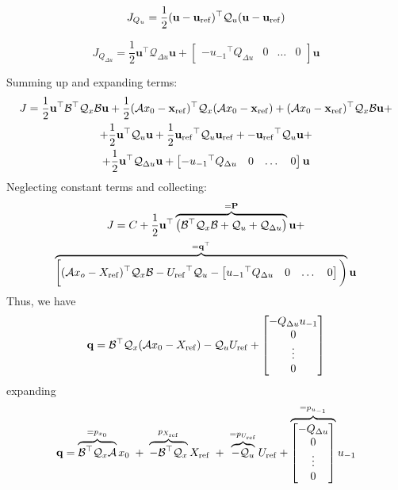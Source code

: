 \documentclass[a4paper,12pt,fleqn]{article}
\newcommand{\PQP}{\mathbf{P}}
\newcommand{\qQP}{\mathbf{q}}
\newcommand{\varxvec}{\mathbf{x}}
\newcommand{\varuvec}{\mathbf{u}}
\newcommand{\baru}{u_{-1}}
\begin{document}
\begin{equation}
 J_{Q_u} =  \frac{1}{2} (\varuvec - \varuvec_{\rm ref})^\top \mathcal{Q}_u (\varuvec-\varuvec_{\rm ref})
\end{equation}

\begin{equation}
 J_{Q_{\Delta u}} =  \frac{1}{2} \varuvec^\top \mathcal{Q}_{\Delta u} \varuvec +   
 \begin{bmatrix}
  -{\baru}^\top Q_{\Delta u} & 0 & \dots  & 0
 \end{bmatrix} \varuvec
\end{equation}

Summing up and expanding terms:
\begin{multline}
 J = 
 \frac{1}{2}\varuvec^\top \mathcal{B}^\top \mathcal{Q}_x \mathcal{B} \varuvec + 
 \frac{1}{2} (\mathcal{A}x_0 - \varxvec_{\rm ref})^\top \mathcal{Q}_x (\mathcal{A}x_0-\varxvec_{\rm ref}) +
 (\mathcal{A}x_0 -\varxvec_{\rm ref})^\top\mathcal{Q}_x \mathcal{B} \varuvec + \\
 + \frac{1}{2} \varuvec^\top \mathcal{Q}_u \varuvec +
 \frac{1}{2}{\varuvec_{\rm ref}}^\top \mathcal{Q}_u \varuvec_{\rm ref} + 
 -{\varuvec_{\rm ref}}^\top\mathcal{Q}_u \varuvec +\\ 
 +\frac{1}{2} \varuvec^\top \mathcal{Q}_{\Delta u} \varuvec +
\begin{bmatrix}
  -{\baru}^\top Q_{\Delta u} & 0 & \dots  & 0
 \end{bmatrix} \varuvec 
\end{multline}
Neglecting constant terms and collecting:
\begin{multline}
 J = C + \frac{1}{2} \varuvec^\top \overbrace{\big(\mathcal{B}^\top \mathcal{Q}_x \mathcal{B} + \mathcal{Q}_u + \mathcal{Q}_{\Delta u}\big)} ^{=\PQP}\varuvec + \\
 \overbrace{\bigg [(\mathcal{A}x_o - X_{\rm ref})^\top \mathcal{Q}_x \mathcal{B} -{U_{\rm ref}}^\top\mathcal{Q}_u -
 \begin{bmatrix}
  {\baru}^\top Q_{\Delta u} & 0 & \dots  & 0
 \end{bmatrix}\bigg)}^{=\qQP^\top} \varuvec
\end{multline}
Thus, we have
\begin{equation}
 \qQP = \mathcal{B}^\top \mathcal{Q}_x(\mathcal{A}x_0 - X_{\rm ref}) - \mathcal{Q}_uU_{\rm ref} + 
  \begin{bmatrix}
 -Q_{\Delta u} \baru \\ 0 \\ \vdots \\0
 \end{bmatrix}
\end{equation}
expanding
\begin{equation}
 \qQP = \overbrace{\mathcal{B}^\top \mathcal{Q}_x\mathcal{A}}^{=p_{x_0}}x_0  \;+\; \overbrace{-\mathcal{B}^\top \mathcal{Q}_x}^{p_{X_{\rm ref}}}X_{\rm ref}\;+\; \overbrace{-\mathcal{Q}_u}^{=p_{U_{\rm ref}}}U_{\rm ref} + 
\overbrace{
  \begin{bmatrix}
 -Q_{\Delta u} \\ 0 \\ \vdots \\0
 \end{bmatrix}
}^{=p_{\baru}}
\baru
\end{equation}
\end{document}
